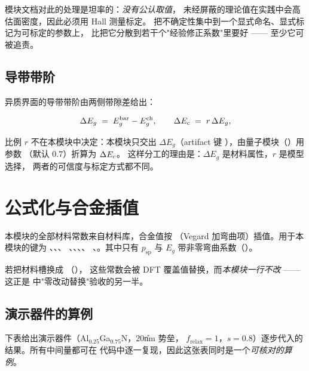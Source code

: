 模块文档对此的处理是坦率的：\emph{没有公认取值}，
未经屏蔽的理论值在实践中会高估面密度，因此必须用 Hall 测量标定。
把不确定性集中到一个显式命名、显式标记为可标定的参数上，
比把它分散到若干个"经验修正系数"里要好 —— 至少它可被追责。

\subsection{导带带阶}
\label{sec:pol-offset}

异质界面的导带带阶由两侧带隙差给出：

\begin{equation}
\Delta E_g \;=\; E_g^{\text{bar}} - E_g^{\text{ch}},
\qquad
\Delta E_{\mathrm{c}} \;=\; r\,\Delta E_g ,
\label{eq:pol-offset}
\end{equation}

比例 $r$ 不在本模块中决定：本模块只交出 $\Delta E_g$（artifact 键
），由量子模块（）用参数
（默认 $0.7$）折算为 $\Delta E_{\mathrm{c}}$。
这样分工的理由是：$\Delta E_g$ 是材料属性，$r$ 是模型选择，
两者的可信度与标定方式都不同。

\section{公式化与合金插值}
\label{sec:pol-formulation}

本模块的全部材料常数来自材料库，合金值按 
（Vegard 加弯曲项）插值。用于本模块的键为
、、、
、、、、
、。其中只有 $p_{\text{sp}}$ 与 $E_g$
带非零弯曲系数（）。

若把材料槽换成 （），
这些常数会被 DFT 覆盖值替换，而\emph{本模块一行不改} ——
这正是  中"零改动替换"验收的另一半。

\subsection{演示器件的算例}
\label{sec:pol-worked}

下表给出演示器件（Al$_{0.25}$Ga$_{0.75}$N，$20$\U{nm} 势垒，
$f_{\text{relax}}=1$，$s=0.8$）逐步代入的结果。所有中间量都可在
代码中逐一复现，因此这张表同时是一个\emph{可核对的算例}。

